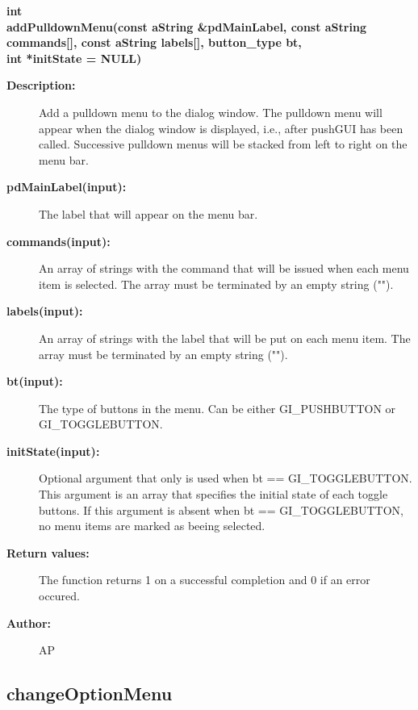 \begin{flushleft} \textbf{%
int  \\ 
\settowidth{\DialogDataIncludeArgIndent}{addPulldownMenu(}%
addPulldownMenu(const aString \&pdMainLabel, const aString commands[], const aString labels[], button\_type bt, \\ 
\hspace{\DialogDataIncludeArgIndent}int *initState  = NULL)
}\end{flushleft}
\begin{description}
\item[{\bf Description:}]  Add a pulldown menu to the dialog window. The pulldown menu will appear when the
 dialog window is displayed, i.e., after pushGUI has been called. Successive pulldown menus 
 will be stacked from left to right on the menu bar.

\item[{\bf pdMainLabel(input):}]  The label that will appear on the menu bar.

\item[{\bf commands(input):}]  An array of strings with the command that will be issued when each menu
  item is selected. The array must be terminated by an empty string ("").

\item[{\bf labels(input):}]  An array of strings with the label that will be put on each menu
  item. The array must be terminated by an empty string ("").

\item[{\bf bt(input):}]  The type of buttons in the menu. Can be either GI\_PUSHBUTTON or GI\_TOGGLEBUTTON.

\item[{\bf initState(input):}]  Optional argument that only is used when bt == GI\_TOGGLEBUTTON. This argument
  is an array that specifies the initial state of each toggle buttons. If this argument is absent
  when bt == GI\_TOGGLEBUTTON, no menu items are marked as beeing selected.

\item[{\bf Return values:}]  The function returns 1 on a successful completion and 0 if an error occured.

\item[{\bf Author:}]  AP
\end{description}
\subsection{changeOptionMenu}
 
